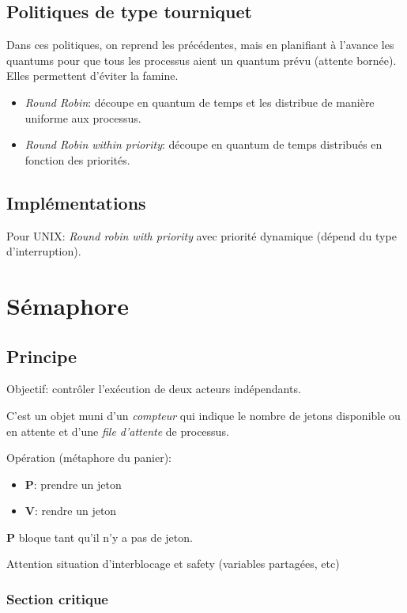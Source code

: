 \documentclass[a4paper]{article}
\begin{document}
\begin{multicols*}{2}
    \subsection{Politiques de type tourniquet}

    Dans ces politiques, on reprend les précédentes, mais en planifiant à l'avance les quantums pour que tous les processus aient un quantum prévu (attente bornée).
    Elles permettent d'éviter la famine.
    \begin{itemize}
        \item \emph{Round Robin}: découpe en quantum de temps et les distribue de manière uniforme aux processus.
        \item \emph{Round Robin within priority}: découpe en quantum de temps distribués en fonction des priorités.
    \end{itemize}

    \subsection{Implémentations}

    Pour {UNIX}: \emph{Round robin with priority} avec priorité dynamique (dépend du type d'interruption).


    \section{Sémaphore}

    \subsection{Principe}
    Objectif: contrôler l'exécution de deux acteurs indépendants.

    C'est un objet muni d'un \emph{compteur} qui indique le nombre de jetons disponible ou en attente et d'une \emph{file d'attente} de processus. 

    Opération (métaphore du panier): 
    \begin{itemize} 
        \item \textbf{P}: prendre un jeton
        \item \textbf{V}: rendre un jeton
    \end{itemize}

    \textbf{P} bloque tant qu'il n'y a pas de jeton. 

    Attention situation d'interblocage et safety (variables partagées, etc)

    \subsubsection{Section critique}


\end{multicols*}
\end{document}
